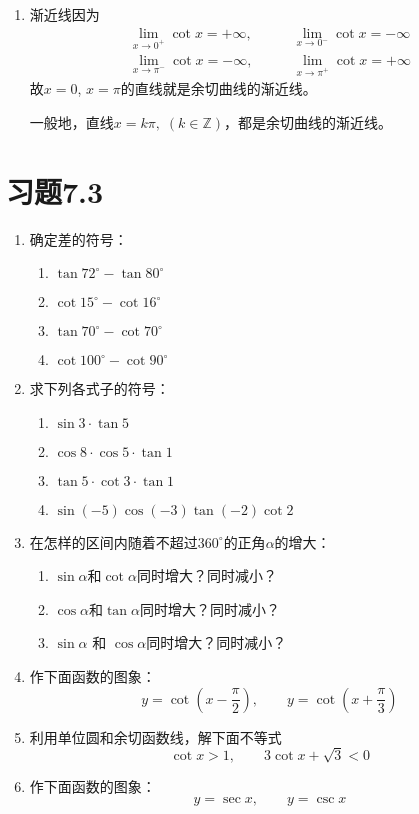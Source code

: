 \begin{enumerate}
\item 渐近线\quad 因为
\[\begin{split}
    \lim_{x\to 0^+} \cot x=+\infty,&\qquad \lim_{x\to 0^-} \cot x=-\infty\\
    \lim_{x\to \pi^-} \cot x=-\infty, &\qquad \lim_{x\to \pi^+} \cot x=+\infty
\end{split}\]
故$x=0$, $x=\pi$的直线就是余切曲线的渐近线。

一般地，直线$x=k\pi,\; (k\in\mathbb{Z})$，都是余切曲线的渐近线。

\end{enumerate}


\section*{习题7.3}

\begin{enumerate}
    \item 确定差的符号：
\begin{multicols}{2}
    \begin{enumerate}
\item $\tan 72^{\circ}-\tan 80^{\circ}$
\item $\cot 15^{\circ}-\cot 16^{\circ}$
\item $\tan 70^{\circ}-\cot 70^{\circ}$
\item $\cot 100^{\circ}-\cot 90^{\circ}$
    \end{enumerate}
\end{multicols}

\item 求下列各式子的符号：
\begin{multicols}{2}
    \begin{enumerate}
\item $\sin 3\cdot \tan 5$
\item $\cos 8\cdot \cos 5\cdot \tan 1$
\item $\tan 5\cdot \cot 3\cdot \tan 1$
\item $\sin(-5)\cos(-3)\tan(-2)\cot2$
    \end{enumerate}
\end{multicols}

\item 在怎样的区间内随着不超过$360^{\circ}$的正角$\alpha$的增大：
\begin{enumerate}
    \item $\sin\alpha$和$\cot\alpha$同时增大？同时减小？
    \item $\cos\alpha$和$\tan\alpha$同时增大？同时减小？
    \item $\sin\alpha$ 和 $\cos\alpha$同时增大？同时减小？
\end{enumerate}


\item 作下面函数的图象：
\[y=\cot\left(x-\frac{\pi}{2}\right),\qquad y=\cot\left(x+\frac{\pi}{3}\right) \]
\item 利用单位圆和余切函数线，解下面不等式
\[\cot x> 1,\qquad 3\cot x+\sqrt{3}<0\]

\item 作下面函数的图象：
\[y=\sec x,\qquad y=\csc x\]
\end{enumerate}



